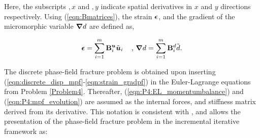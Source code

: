 \documentclass[11pt]{article}
\begin{document}
\noindent Here, the subscripts $,x$ and $,y$ indicate spatial derivatives in $x$ and $y$ directions respectively. Using (\ref{eqn:Bmatrices}), the strain $\hbox{$\hbox{\boldmath$\epsilon$}$}$, and the gradient of the micromorphic variable $\hbox{\boldmath$\nabla$}\hbox{$d$}$ are defined as,

\begin{equation}\label{eqn:strain_gradpf}
  \boldsymbol{\epsilon} = \sum\limits_{i = 1}^m {\mathbf{B}_i^{\boldsymbol{u}} \tilde{\boldsymbol{u}}_i}\;\;\;\text{ , }
\hbox{\boldmath$\nabla$}\hbox{$d$} = \sum\limits_{i = 1}^m {\mathbf{B}_i^{d} \tilde{\hbox{$d$}}}.
\end{equation}

\noindent The discrete phase-field fracture problem is obtained upon inserting (\ref{eqn:discrete_disp_mpf}-\ref{eqn:strain_gradpf}) in the Euler-Lagrange equations from Problem \ref{Problem4}. Thereafter, (\ref{eqn:P4:EL_momentumbalance}) and (\ref{eqn:P4:mpf_evolution}) are assumed as the internal forces, and stiffness matrix derived from its derivative. This notation is consistent with \cite{de2012nonlinear}, and allows the presentation of the phase-field fracture problem in the incremental iterative framework as:
\end{document}
